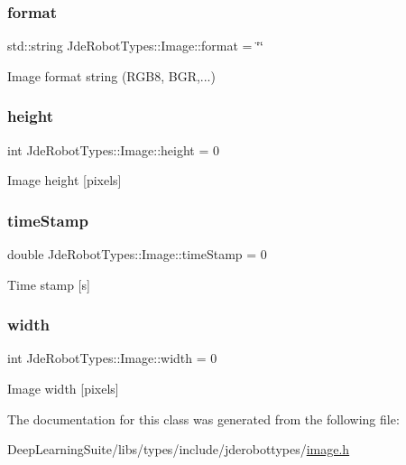 \subsubsection{\texorpdfstring{format}{format}}
{\footnotesize\ttfamily std\+::string Jde\+Robot\+Types\+::\+Image\+::format = \char`\"{}\char`\"{}}

Image format string (R\+G\+B8, B\+GR,...) \mbox{\label{class_jde_robot_types_1_1_image_ad3b073fd5f50c62c535d0083ca0f9ae9}} 
\subsubsection{\texorpdfstring{height}{height}}
{\footnotesize\ttfamily int Jde\+Robot\+Types\+::\+Image\+::height = 0}

Image height \mbox{[}pixels\mbox{]} \mbox{\label{class_jde_robot_types_1_1_image_a4557271a34c2a35e6a9c03946ed2332c}} 
\subsubsection{\texorpdfstring{time\+Stamp}{timeStamp}}
{\footnotesize\ttfamily double Jde\+Robot\+Types\+::\+Image\+::time\+Stamp = 0}

Time stamp \mbox{[}s\mbox{]} \mbox{\label{class_jde_robot_types_1_1_image_ac377507ac13a54f523169f55911e3147}} 
\subsubsection{\texorpdfstring{width}{width}}
{\footnotesize\ttfamily int Jde\+Robot\+Types\+::\+Image\+::width = 0}

Image width \mbox{[}pixels\mbox{]} 

The documentation for this class was generated from the following file\+:\begin{DoxyCompactItemize}
\item 
Deep\+Learning\+Suite/libs/types/include/jderobottypes/\hyperlink{image_8h}{image.\+h}\end{DoxyCompactItemize}
